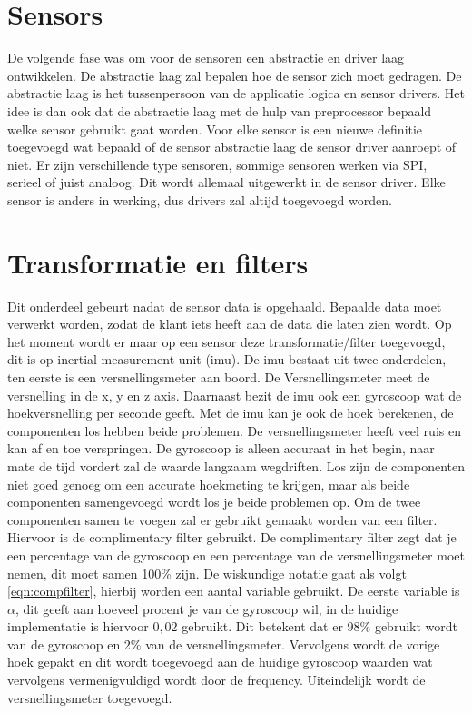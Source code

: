 \section{Sensors}
De volgende fase was om voor de sensoren een abstractie en driver laag ontwikkelen. De abstractie laag zal bepalen hoe de sensor zich moet gedragen. De abstractie laag is het tussenpersoon van de applicatie logica en sensor drivers. Het idee is dan ook dat de abstractie laag met de hulp van preprocessor bepaald welke sensor gebruikt gaat worden. Voor elke sensor is een nieuwe definitie toegevoegd wat bepaald of de sensor abstractie laag de sensor driver aanroept of niet. Er zijn verschillende type sensoren, sommige sensoren werken via SPI, serieel of juist analoog. Dit wordt allemaal uitgewerkt in de sensor driver. Elke sensor is anders in werking, dus drivers zal altijd toegevoegd worden.

\section{Transformatie en filters}
Dit onderdeel gebeurt nadat de sensor data is opgehaald. Bepaalde data moet verwerkt worden, zodat de klant iets heeft aan de data die laten zien wordt. Op het moment wordt er maar op een sensor deze transformatie/filter toegevoegd, dit is op inertial measurement unit (imu). De imu bestaat uit twee onderdelen, ten eerste is een versnellingsmeter aan boord. De Versnellingsmeter meet de versnelling in de x, y en z axis. Daarnaast bezit de imu ook een gyroscoop wat de hoekversnelling per seconde geeft. Met de imu kan je ook de hoek berekenen, de componenten los hebben beide problemen. De versnellingsmeter heeft veel ruis en kan af en toe verspringen. De gyroscoop is alleen accuraat in het begin, naar mate de tijd vordert zal de waarde langzaam wegdriften. Los zijn de componenten niet goed genoeg om een accurate hoekmeting te krijgen, maar als beide componenten samengevoegd wordt los je beide problemen op. Om de twee componenten samen te voegen zal er gebruikt gemaakt worden van een filter. Hiervoor is de complimentary filter gebruikt. De complimentary filter zegt dat je een percentage van de gyroscoop en een percentage van de versnellingsmeter moet nemen, dit moet samen 100\% zijn. De wiskundige notatie gaat als volgt \ref{eqn:compfilter}, hierbij worden een aantal variable gebruikt. De eerste variable is $\alpha$, dit geeft aan hoeveel procent je van de gyroscoop wil, in de huidige implementatie is hiervoor $0,02$ gebruikt. Dit betekent dat er $98\%$ gebruikt wordt van de gyroscoop en $2\%$ van de versnellingsmeter. Vervolgens wordt de vorige hoek gepakt en dit wordt toegevoegd aan de huidige gyroscoop waarden wat vervolgens vermenigvuldigd wordt door de frequency. Uiteindelijk wordt de versnellingsmeter toegevoegd.

